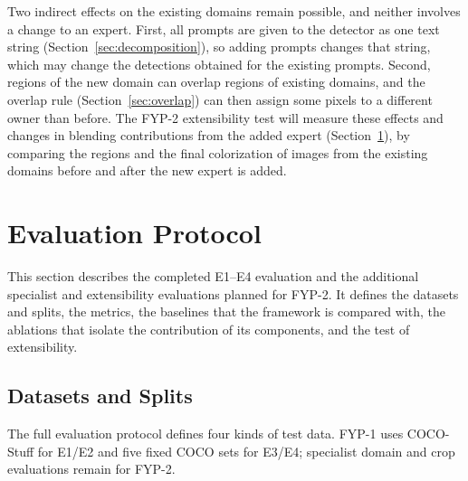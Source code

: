 \documentclass{FastFyp}
\begin{document}
Two indirect effects on the existing domains remain possible, and neither involves a change to an expert. First, all prompts are given to the detector as one text string (Section~\ref{sec:decomposition}), so adding prompts changes that string, which may change the detections obtained for the existing prompts. Second, regions of the new domain can overlap regions of existing domains, and the overlap rule (Section~\ref{sec:overlap}) can then assign some pixels to a different owner than before. The FYP-2 extensibility test will measure these effects and changes in blending contributions from the added expert (Section~\ref{sec:evaluation}), by comparing the regions and the final colorization of images from the existing domains before and after the new expert is added.

\newcommand{\newdomain}{[new domain]}

\section{Evaluation Protocol}
\label{sec:evaluation}

This section describes the completed E1--E4 evaluation and the additional specialist and extensibility evaluations planned for FYP-2. It defines the datasets and splits, the metrics, the baselines that the framework is compared with, the ablations that isolate the contribution of its components, and the test of extensibility.

\subsection{Datasets and Splits}

The full evaluation protocol defines four kinds of test data. FYP-1 uses COCO-Stuff for E1/E2 and five fixed COCO sets for E3/E4; specialist domain and crop evaluations remain for FYP-2.
\end{document}
